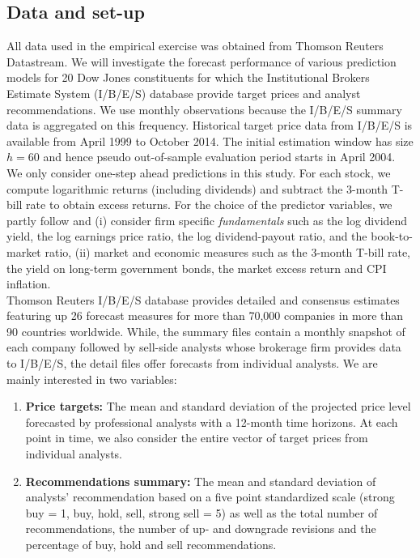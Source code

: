 \subsection{Data and set-up}
All data used in the empirical exercise was obtained from Thomson Reuters Datastream. We will investigate the forecast performance of various prediction models for 20 Dow Jones constituents for which the Institutional Brokers Estimate System (I/B/E/S) database provide target prices and analyst recommendations. We use monthly observations because the I/B/E/S summary data is aggregated on this frequency. Historical target price data from I/B/E/S is available from April 1999 to October 2014. The initial estimation window has size $h=60$ and hence pseudo out-of-sample evaluation period starts in April 2004. We only consider one-step ahead predictions in this study. For each stock, we compute logarithmic returns (including dividends) and subtract the 3-month T-bill rate %
to obtain excess returns. For the choice of the predictor variables, we partly follow \cite{welch2008,pettenuzzo2016} and (i) consider firm specific \textit{fundamentals} such as the log dividend yield, the log earnings price ratio, the log dividend-payout ratio, and the book-to-market ratio, (ii) market and economic measures such as the 3-month T-bill rate, the yield on long-term government bonds, %
the market excess return and %
CPI inflation.\\
%
\indent Thomson Reuters I/B/E/S database provides detailed and consensus estimates featuring up 26 forecast measures for more than 70,000 companies in	more than 90 countries worldwide. While, the summary files contain a monthly snapshot of each company followed by sell-side analysts whose brokerage firm provides data to I/B/E/S, the detail files offer forecasts from individual analysts. We are mainly interested in two variables: 
\begin{enumerate}
\item \textbf{Price targets:} The mean and standard deviation of the projected price level forecasted by professional analysts with a 12-month time horizons. At each point in time, we also consider the entire vector of target prices from individual analysts.
\item \textbf{Recommendations summary:} The mean and standard deviation of analysts' recommendation based on a five point standardized scale (strong buy = 1, buy, hold, sell, strong sell = 5) as well as the total number of recommendations, the number of up- and downgrade revisions and the percentage of buy, hold and sell recommendations.
\end{enumerate}
